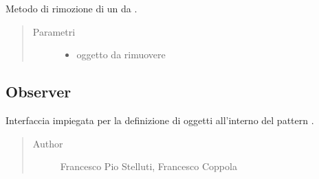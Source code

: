 \documentclass[letterpaper,10pt,italian,openany,oneside]{sphinxmanual}
\begin{document}
\begin{fulllineitems}
\label{\detokenize{source/it/unicam/cs/pa/mastermind/gamecore/Observable:it.unicam.cs.pa.mastermind.gamecore.Observable.removeObserver(Observer)}}
Metodo di rimozione di un  da .
\begin{quote}\begin{description}
\item[{Parametri}] \leavevmode\begin{itemize}
\item {} 
 \textendash{} oggetto  da rimuovere

\end{itemize}

\end{description}\end{quote}

\end{fulllineitems}



\subsection{Observer}
\label{\detokenize{source/it/unicam/cs/pa/mastermind/gamecore/Observer:observer}}\label{\detokenize{source/it/unicam/cs/pa/mastermind/gamecore/Observer::doc}}

\begin{fulllineitems}
\label{\detokenize{source/it/unicam/cs/pa/mastermind/gamecore/Observer:it.unicam.cs.pa.mastermind.gamecore.Observer}}
Interfaccia impiegata per la definizione di oggetti  all’interno del pattern .
\begin{quote}\begin{description}
\item[{Author}] \leavevmode
Francesco Pio Stelluti, Francesco Coppola

\end{description}\end{quote}

\end{fulllineitems}
\end{document}
